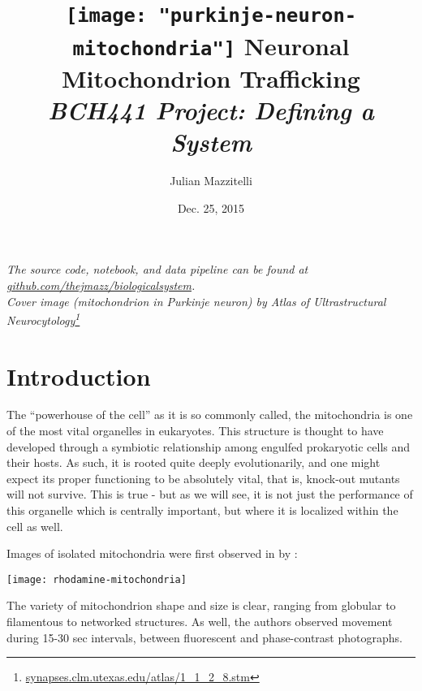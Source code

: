 \title{
\vspace{-155pt}
\hspace*{-80pt}\texttt{[image: "purkinje-neuron-mitochondria"]}
Neuronal Mitochondrion Trafficking \\
\small{\textit{BCH441 Project: Defining a System}}
}
\author{Julian Mazzitelli}
\date{Dec. 25, 2015}

\maketitle

\begin{bottompar}
\begin{center}
\textit{
The source code, notebook, and data pipeline can be found at
\href{https://github.com/thejmazz/biologicalsystem}{github.com/thejmazz/biologicalsystem}. \\
Cover image (mitochondrion in Purkinje neuron) by Atlas of Ultrastructural Neurocytology\footnote{\href{http://synapses.clm.utexas.edu/atlas/1_1_2_8.stm}{synapses.clm.utexas.edu/atlas/1\_1\_2\_8.stm}}
}
\end{center}
\end{bottompar}

\tableofcontents


\section{Introduction}

The ``powerhouse of the cell'' as it is so commonly called, the mitochondria is
one of the most vital organelles in eukaryotes. This structure is thought to
have developed through a symbiotic relationship among engulfed prokaryotic cells
and their hosts. As such, it is rooted quite deeply evolutionarily, and one
might expect its proper functioning to be absolutely vital, that is, knock-out
mutants will not survive. This is true - but as we will see, it is not just the
performance of this organelle which is centrally important, but where it is
localized within the cell as well.

Images of isolated mitochondria were first observed in \citeyear{Lincoln1979}
by \citeauthor{Lincoln1979}:

\begin{center}
  \texttt{[image: rhodamine-mitochondria]}
\end{center}

\noindent The variety of mitochondrion shape and size is clear, ranging from
globular to filamentous to networked structures. As well, the authors observed
movement during 15-30 sec intervals, between fluorescent and phase-contrast
photographs.

